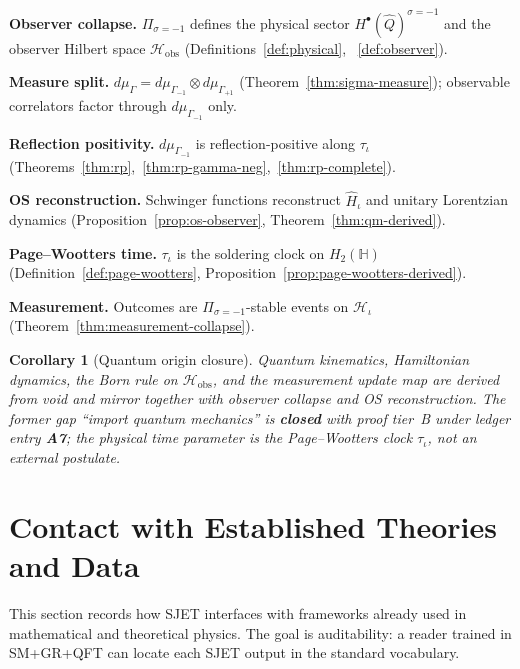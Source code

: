 \documentclass[11pt]{article}
\theoremstyle{plain}
\newtheorem{corollary}[theorem]{Corollary}
\theoremstyle{definition}
\theoremstyle{remark}
\numberwithin{equation}{section}
\newcommand{\Quat}{\mathbb{H}}
\begin{document}
\medskip
\noindent\textbf{Observer collapse.}
$\Pi_{\sigma=-1}$ defines the physical sector
$H^\bullet(\hat Q)^{\sigma=-1}$ and the observer Hilbert space
$\mathcal{H}_{\mathrm{obs}}$ (Definitions~\ref{def:physical},
~\ref{def:observer}).

\medskip
\noindent\textbf{Measure split.}
$d\mu_\Gamma=d\mu_{\Gamma_{-1}}\otimes d\mu_{\Gamma_{+1}}$
(Theorem~\ref{thm:sigma-measure}); observable correlators factor through
$d\mu_{\Gamma_{-1}}$ only.

\medskip
\noindent\textbf{Reflection positivity.}
$d\mu_{\Gamma_{-1}}$ is reflection-positive along $\tau_\iota$
(Theorems~\ref{thm:rp},~\ref{thm:rp-gamma-neg},~\ref{thm:rp-complete}).

\medskip
\noindent\textbf{OS reconstruction.}
Schwinger functions reconstruct $\hat H_\iota$ and unitary Lorentzian
dynamics (Proposition~\ref{prop:os-observer}, Theorem~\ref{thm:qm-derived}).

\medskip
\noindent\textbf{Page--Wootters time.}
$\tau_\iota$ is the soldering clock on $H_2(\Quat)$
(Definition~\ref{def:page-wootters}, Proposition~\ref{prop:page-wootters-derived}).

\medskip
\noindent\textbf{Measurement.}
Outcomes are $\Pi_{\sigma=-1}$-stable events on $\mathcal{H}_\iota$
(Theorem~\ref{thm:measurement-collapse}).

\begin{corollary}[Quantum origin closure]\label{cor:qm-origin-closure}
Quantum kinematics, Hamiltonian dynamics, the Born rule on
$\mathcal{H}_{\mathrm{obs}}$, and the measurement update map are derived from
void and mirror together with observer collapse and OS reconstruction. The
former gap ``import quantum mechanics'' is \textbf{closed} with proof tier~B
under ledger entry \textbf{A7}; the physical time parameter is the
Page--Wootters clock $\tau_\iota$, not an external postulate.
\end{corollary}%
\section{Contact with Established Theories and Data}
\label{sec:standard-theories}

This section records how SJET interfaces with frameworks already used in
mathematical and theoretical physics. The goal is auditability: a reader
trained in SM+GR+QFT can locate each SJET output in the standard vocabulary.
\end{document}
